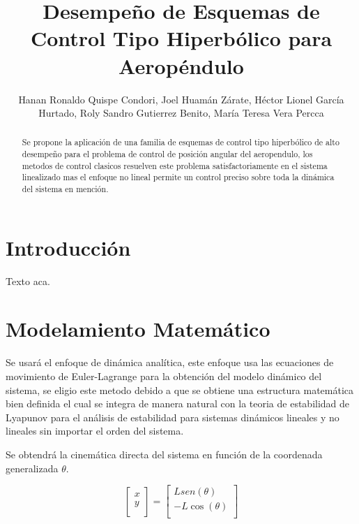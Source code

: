 \documentclass[a4paper]{IEEEtran} %
\begin{document}
\title{Desempeño de Esquemas de Control Tipo Hiperbólico para Aeropéndulo}
\author{Hanan Ronaldo Quispe Condori, Joel Huamán Zárate, Héctor Lionel García Hurtado, Roly Sandro Gutierrez Benito, María Teresa Vera Percca}
\maketitle
\begin{abstract}
    Se propone la aplicación de una familia de esquemas de control tipo hiperbólico de alto desempeño para el problema de control de posición angular del aeropendulo, los metodos de control clasicos resuelven este problema satisfactoriamente en el sistema linealizado mas el enfoque no lineal permite un control preciso sobre toda la dinámica del sistema en mención.
\end{abstract}
\section{Introducción}
Texto aca\cite{gunnel2017tuning}.
\section{Modelamiento Matemático}
\label{sec:modeling}
Se usará el enfoque de dinámica analítica, este enfoque usa las ecuaciones de movimiento de Euler-Lagrange para la obtención del modelo dinámico del sistema, se eligio este metodo debido a que se obtiene una estructura matemática bien definida el cual se integra de manera natural con la teoria de estabilidad de Lyapunov para el análisis de estabilidad para sistemas dinámicos lineales y no lineales sin importar el orden del sistema.\cite{reyes2019drones}

Se obtendrá la cinemática directa del sistema en función de la coordenada generalizada $\theta$.

\begin{equation}
    \begin{bmatrix}  x \\ y \\
    \end{bmatrix}=
    \begin{bmatrix} Lsen(\theta) \\ -L\cos(\theta)  \\
    \end{bmatrix}
    \label{eq:cin_direc}
\end{equation}
\end{document}
